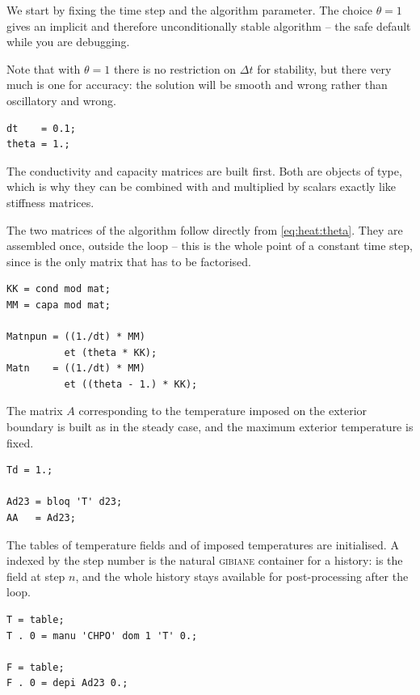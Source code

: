 \begin{castemcom}
We start by fixing the time step and the algorithm parameter. The choice
$\theta=1$ gives an implicit and therefore unconditionally stable algorithm --
the safe default while you are debugging.

Note that with $\theta=1$ there is no restriction on $\Delta t$ for stability,
but there very much is one for accuracy: the solution will be smooth and
wrong rather than oscillatory and wrong.
\end{castemcom}
\begin{castemlines}
\begin{verbatim}
dt    = 0.1;
theta = 1.;
\end{verbatim}
\end{castemlines}

\begin{castemcom}
%
The conductivity and capacity matrices are built first. Both are objects of
 type, which is why they can be combined with  and
multiplied by scalars exactly like stiffness matrices.

The two matrices of the algorithm follow directly from
\eqref{eq:heat:theta}. They are assembled once, outside the loop -- this is
the whole point of a constant time step, since  is the only
matrix that has to be factorised.
\end{castemcom}
\begin{castemlines}
\begin{verbatim}
KK = cond mod mat;
MM = capa mod mat;

Matnpun = ((1./dt) * MM)
          et (theta * KK);
Matn    = ((1./dt) * MM)
          et ((theta - 1.) * KK);
\end{verbatim}
\end{castemlines}

\begin{castemcom}
The matrix $A$ corresponding to the temperature imposed on the exterior
boundary is built as in the steady case, and the maximum exterior temperature
 is fixed.
\end{castemcom}
\begin{castemlines}
\begin{verbatim}
Td = 1.;

Ad23 = bloq 'T' d23;
AA   = Ad23;
\end{verbatim}
\end{castemlines}

\begin{castemcom}
The tables of temperature fields and of imposed temperatures are initialised.
A  indexed by the step number is the natural \textsc{gibiane}
container for a history:  is the field at step $n$, and the whole
history stays available for post-processing after the loop.
\end{castemcom}
\begin{castemlines}
\begin{verbatim}
T = table;
T . 0 = manu 'CHPO' dom 1 'T' 0.;

F = table;
F . 0 = depi Ad23 0.;
\end{verbatim}
\end{castemlines}

